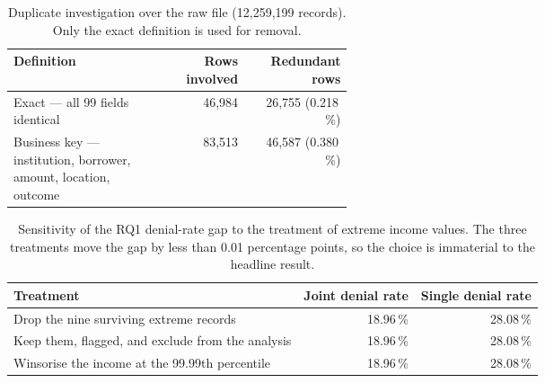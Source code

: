 \documentclass[sigconf,balance=false]{acmart}
\begin{document}
\begin{table}[t]
\caption{Duplicate investigation over the raw file (12{,}259{,}199 records).
         Only the exact definition is used for removal.}
\label{tab:duplicates}
\centering
\footnotesize
\begin{tabular}{@{}p{0.44\linewidth}rr@{}}
\toprule
Definition & Rows involved & Redundant rows \\
\midrule
Exact --- all 99 fields identical
& 46{,}984 & 26{,}755 (0.218\,\%) \\
Business key --- institution, borrower, amount, location, outcome
& 83{,}513 & 46{,}587 (0.380\,\%) \\
\bottomrule
\end{tabular}
\end{table}

\begin{table}[t]
\caption{Sensitivity of the RQ1 denial-rate gap to the treatment of extreme
         income values. The three treatments move the gap by less than
         0.01 percentage points, so the choice is immaterial to the
         headline result.}
\label{tab:sensitivity}
\centering
\footnotesize
\begin{tabular}{@{}p{}rr@{}}
\toprule
Treatment & Joint denial rate & Single denial rate \\
\midrule
Drop the nine surviving extreme records & 18.96\,\% & 28.08\,\% \\
Keep them, flagged, and exclude from the analysis & 18.96\,\% & 28.08\,\% \\
Winsorise the income at the 99.99th percentile & 18.96\,\% & 28.08\,\% \\
\bottomrule
\end{tabular}
\end{table}
\end{document}
